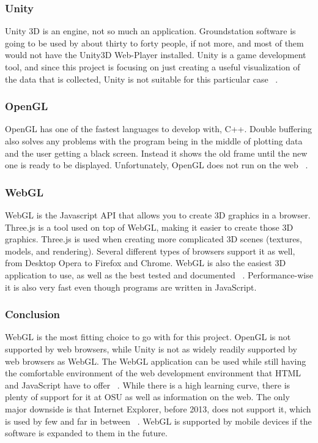 \documentclass[10pt,draftclsnofoot,onecolumn]{IEEEtran}
\begin{document}
	\subsubsection{Unity}
	Unity 3D is an engine, not so much an application. 
	Groundstation software is going to be used by about thirty to forty people, if not more, and most of them would not have the
	Unity3D Web-Player installed. 
	Unity is a game development tool, and since this project is focusing on just creating a useful visualization of the 
	data that is collected, Unity is not suitable for this particular case ~\cite{unity}.
	
	\subsubsection{OpenGL}
	OpenGL has one of the fastest languages to develop with, C++. 
	Double buffering also solves any problems with the program being in the middle of plotting data and the user getting
	a black screen. 
	Instead it shows the old frame until the new one is ready to be displayed. 
	Unfortunately, OpenGL does not run on the web ~\cite{why-you-should-use-webgl}.
	
	\subsubsection{WebGL}
	WebGL is the Javascript API that allows you to create 3D graphics in a browser. 
	Three.js is a tool used on top of WebGL, making it easier to create those 3D graphics. 
	Three.js is used when creating more complicated 3D scenes (textures, models, and rendering). 
	Several different types of browsers support it as well, from Desktop Opera to Firefox and Chrome. 
	WebGL is also the easiest 3D application to use, as well as the best tested and documented ~\cite{webgl-best-practices}. 
	Performance-wise it is also very fast even though programs are written in JavaScript. 
	
	\subsubsection{Conclusion}
	WebGL is the most fitting choice to go with for this project.
	OpenGL is not supported by web browsers, while Unity is not as widely readily supported by web browsers as WebGL.
	The WebGL application can be used while still having the comfortable environment of the web development
	environment that HTML and JavaScript have to offer ~\cite{why-use-webgl-for-graphics-research}. 
	While there is a high learning curve, there is plenty of support for it at OSU as well as information on the web.
	The only major downside is that Internet Explorer, before 2013, does not support it, which is used by few and 
	far in between ~\cite{internet-ex}. 
	WebGL is supported by mobile devices if the software is expanded to them in the future.
	
\end{document}

